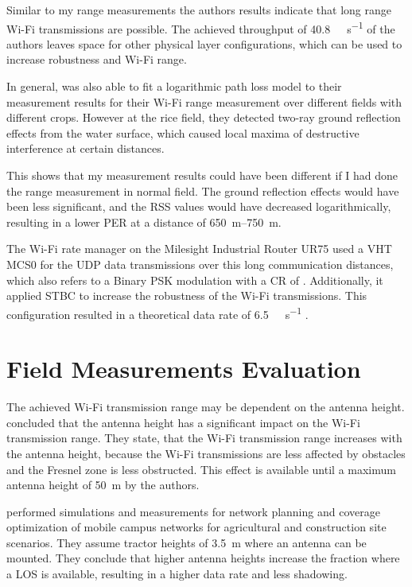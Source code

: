 Similar to my range measurements the authors results indicate that long range Wi-Fi transmissions are possible. The achieved throughput of \SI{40.8}{\mega\bit\per\second} of
the authors leaves space for other physical layer configurations, which can be used to increase robustness and Wi-Fi range.

In general, \textcite{brinkhoff_characterization_2017} was also able to fit a logarithmic path loss model to their measurement results
for their Wi-Fi range measurement over different fields with different crops. However at the rice field, they detected
two-ray ground reflection effects from the water surface, which caused local maxima of destructive interference at certain distances.

This shows that my measurement results could have been different if I had done the range measurement in normal field.
The ground reflection effects would have been less significant, and the \ac{RSS} values would have decreased logarithmically,
resulting in a lower \ac{PER} at a distance of \SIrange{650}{750}{\metre}.


The Wi-Fi rate manager on the Milesight Industrial Router UR75 used a \ac{VHT} \ac{MCS}0 for the \ac{UDP} data transmissions over this long communication distances, which also refers to a Binary \ac{PSK} modulation with a \ac{CR} of .
Additionally, it applied \ac{STBC} to increase the robustness of the Wi-Fi transmissions. This configuration resulted in a theoretical data rate of \SI{6.5}{\mega\bit\per\second} \cite{ieee_standard_2020}.

\section{Field Measurements Evaluation}

The achieved Wi-Fi transmission range may be dependent on the antenna height. \textcite{brinkhoff_characterization_2017} concluded that
the antenna height has a significant impact on the Wi-Fi transmission range.
They state, that the Wi-Fi transmission range increases
with the antenna height, because the Wi-Fi transmissions are less affected by obstacles and the Fresnel zone is less obstructed.
This effect is available until a maximum antenna height of \SI{50}{\metre} by the authors.

\textcite{krause_network_2021} performed simulations and measurements for network planning and coverage optimization
of mobile campus networks for agricultural and construction site scenarios.
They assume tractor heights of \SI{3. 5}{\metre} where an antenna can be mounted.
They conclude that higher antenna heights increase the fraction where a \ac{LOS} is available, resulting in
a higher data rate and less shadowing.

